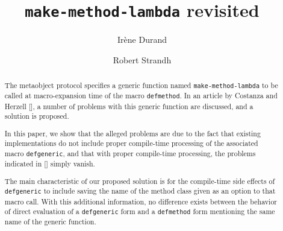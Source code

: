 \documentclass[format=sigconf]{acmart}
\begin{document}

\title{\texttt{make-method-lambda} revisited}

\author{Irène Durand}

\author{Robert Strandh}






\begin{abstract}
The \commonlisp{} metaobject protocol specifies a generic function
named \texttt{make-method-lambda} to be called at macro-expansion time
of the macro \texttt{defmethod}. 
In an article by Costanza and Herzell [], a number of problems with
this generic function are discussed, and a solution is proposed. 

In this paper, we show that the alleged problems are due to the fact
that existing implementations do not include proper compile-time
processing of the associated macro \texttt{defgeneric}, and that with
proper compile-time processing, the problems indicated in [] simply
vanish.

The main characteristic of our proposed solution is for the
compile-time side effects of \texttt{defgeneric} to include saving the
name of the method class given as an option to that macro call.  With
this additional information, no difference exists between the behavior
of direct evaluation of a \texttt{defgeneric} form and a
\texttt{defmethod} form mentioning the same name of the generic function.
\end{abstract}
\end{document}
